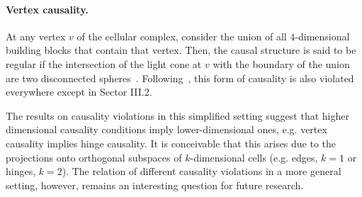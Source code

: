 \paragraph{Vertex causality.} At any vertex $v$ of the cellular complex, consider the union of all $4$-dimensional building blocks that contain that vertex. Then, the causal structure is said to be regular if the intersection of the light cone at $v$ with the boundary of the union are two disconnected spheres~\cite{Asante:2021phx}. Following~\cite{Jercher:2023csk}, this form of causality is also violated everywhere except in Sector III.2.

The results on causality violations in this simplified setting suggest that higher dimensional causality conditions imply lower-dimensional ones, e.g. vertex causality implies hinge causality. It is conceivable that this arises due to the projections onto orthogonal subspaces of $k$-dimensional cells (e.g. edges, $k=1$ or hinges, $k=2$). The relation of different causality violations in a more general setting, however, remains an interesting question for future research.
